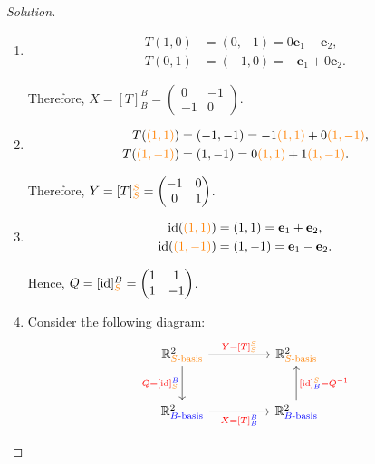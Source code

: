 \documentclass[12pt]{article}
\newenvironment{solution}
{\begin{proof}[Solution]}
{\end{proof}}
\begin{document}
\begin{solution}
\begin{enumerate}
\item[(a)]
\begin{align*}
T(1,0)
    &= (0,-1)
     = 0\mathbf{e}_1-\mathbf{e}_2,\\
T(0,1)
    &= (-1,0)
     = -\mathbf{e}_1+0\mathbf{e}_2.
\end{align*}

Therefore, $X=[T]_B^B=
\begin{pmatrix}
0 & -1\\
-1 & 0
\end{pmatrix}$.

\item[(b)]
\begin{align*}
T(\textcolor{orange}{(1,1)})
    &=(-1,-1)=-1\textcolor{orange}{(1,1)}+0\textcolor{orange}{(1,-1)},\\
T(\textcolor{orange}{(1,-1)})
    &=(1,-1)=0\textcolor{orange}{(1,1)}+1\textcolor{orange}{(1,-1)}.
\end{align*}

Therefore, $Y=[T]_{\textcolor{orange}{S}}^{\textcolor{orange}{S}}=
\begin{pmatrix}
-1 & 0\\
0 & 1
\end{pmatrix}$.

\item[(c)]
\begin{align*}
\operatorname{id}(\textcolor{orange}{(1,1)})
    &=(1,1)
     =\mathbf{e}_1+\mathbf{e}_2,\\
\operatorname{id}(\textcolor{orange}{(1,-1)})
    &=(1,-1)
     =\mathbf{e}_1-\mathbf{e}_2.
\end{align*}

Hence, $Q=[\operatorname{id}]_{\textcolor{orange}{S}}^B=
\begin{pmatrix}
1 & 1\\
1 & -1
\end{pmatrix}$.

\item[(d)]
Consider the following diagram:
\[
\begin{tikzcd}[row sep=large, column sep=huge]
\mathbb{R}^2_{\textcolor{orange}{S\text{-basis}}}
    \arrow[r,
        "{\textcolor{orange}{
        \textcolor{red}{Y=[T]}_S^S
        }}"]
    \arrow[d,
        "{\textcolor{red}{
        Q=[\operatorname{id}]_{\textcolor{orange}{S}}^{\textcolor{blue}{B}}
        }}"']
&
\mathbb{R}^2_{\textcolor{orange}{S\text{-basis}}}
\\
\mathbb{R}^2_{\textcolor{blue}{B\text{-basis}}}
    \arrow[r,
        "{\textcolor{blue}{
        \textcolor{red}{X=[T]}_B^B
        }}"']
&
\mathbb{R}^2_{\textcolor{blue}{B\text{-basis}}}
    \arrow[u,
        "{\textcolor{red}{
        [\operatorname{id}]_{\textcolor{blue}{B}}^{\textcolor{orange}{S}}=Q^{-1}
        }}"']
\end{tikzcd}
\]


\end{enumerate}
\end{solution}
\end{document}
